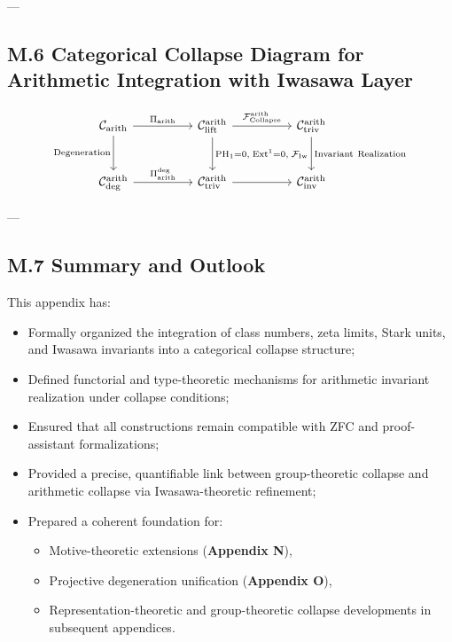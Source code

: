 \documentclass[11pt]{article}
\begin{document}
---

\subsection*{M.6 Categorical Collapse Diagram for Arithmetic Integration with Iwasawa Layer}

\[
\begin{tikzcd}[column sep=huge, row sep=large]
\mathcal{C}_{\mathrm{arith}} \arrow[r, "{\Pi_{\mathrm{arith}}}"] \arrow[d, "{\mathrm{Degeneration}}"']
& \mathcal{C}_{\mathrm{lift}}^{\mathrm{arith}} \arrow[r, "{\mathcal{F}_{\mathrm{Collapse}}^{\mathrm{arith}}}"] \arrow[d, "{\mathrm{PH}_1 = 0,\; \mathrm{Ext}^1 = 0,\; \mathcal{F}_{\mathrm{Iw}}}"]
& \mathcal{C}_{\mathrm{triv}}^{\mathrm{arith}} \arrow[d, "{\mathrm{Invariant\ Realization}}"] \\
\mathcal{C}_{\mathrm{deg}}^{\mathrm{arith}} \arrow[r, "{\Pi_{\mathrm{arith}}^{\mathrm{deg}}}"]
& \mathcal{C}_{\mathrm{triv}}^{\mathrm{arith}} \arrow[r]
& \mathcal{C}_{\mathrm{inv}}^{\mathrm{arith}}
\end{tikzcd}
\]

---

\subsection*{M.7 Summary and Outlook}

This appendix has:
\begin{itemize}
  \item Formally organized the integration of class numbers, zeta limits, Stark units, and Iwasawa invariants into a categorical collapse structure;
  \item Defined functorial and type-theoretic mechanisms for arithmetic invariant realization under collapse conditions;
  \item Ensured that all constructions remain compatible with ZFC and proof-assistant formalizations;
  \item Provided a precise, quantifiable link between group-theoretic collapse and arithmetic collapse via Iwasawa-theoretic refinement;
  \item Prepared a coherent foundation for:
  \begin{itemize}
    \item Motive-theoretic extensions (\textbf{Appendix N}),
    \item Projective degeneration unification (\textbf{Appendix O}),
    \item Representation-theoretic and group-theoretic collapse developments in subsequent appendices.
  \end{itemize}
\end{itemize}
\end{document}
